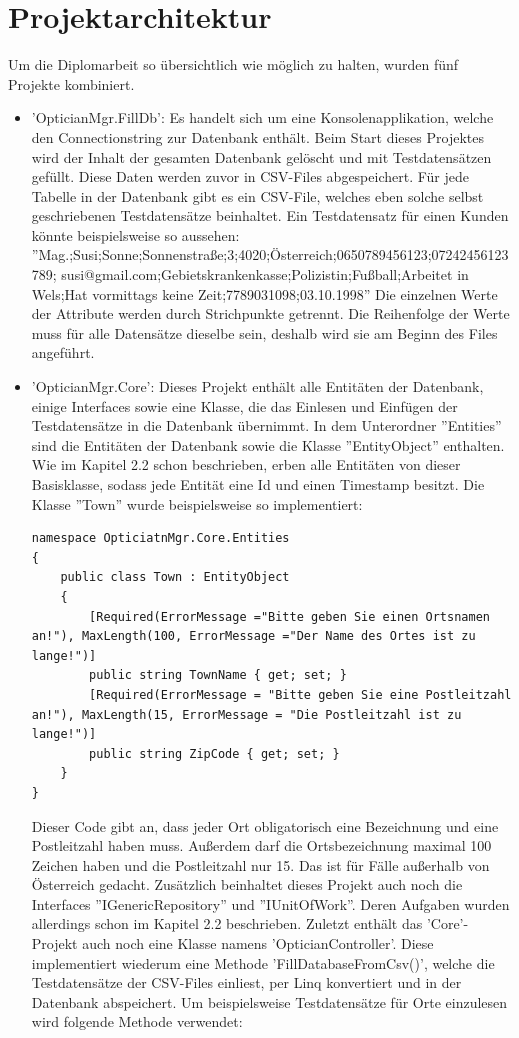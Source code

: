 \section{Projektarchitektur}
Um die Diplomarbeit so übersichtlich wie möglich zu halten, wurden fünf Projekte kombiniert.
\begin{itemize}
\item 'OpticianMgr.FillDb': Es handelt sich um eine Konsolenapplikation, welche den Connectionstring zur Datenbank enthält. Beim Start dieses Projektes wird der Inhalt der gesamten Datenbank gelöscht und mit Testdatensätzen gefüllt. Diese Daten werden zuvor in CSV-Files abgespeichert. Für jede Tabelle in der Datenbank gibt es ein CSV-File, welches eben solche selbst geschriebenen Testdatensätze beinhaltet. Ein Testdatensatz für einen Kunden könnte beispielsweise so aussehen: \newline ''Mag.;Susi;Sonne;Sonnenstraße;3;4020;Österreich;0650789456123;07242456123789; susi@gmail.com;Gebietskrankenkasse;Polizistin;Fußball;Arbeitet in Wels;Hat vormittags keine Zeit;7789031098;03.10.1998'' \newline Die einzelnen Werte der Attribute werden durch Strichpunkte getrennt. Die Reihenfolge der Werte muss für alle Datensätze dieselbe sein, deshalb wird sie am Beginn des Files angeführt.
\item 'OpticianMgr.Core': Dieses Projekt enthält alle Entitäten der Datenbank, einige Interfaces sowie eine Klasse, die das Einlesen und Einfügen der Testdatensätze in die Datenbank übernimmt. \newline In dem Unterordner ''Entities'' sind die Entitäten der Datenbank sowie die Klasse ''EntityObject'' enthalten. Wie im Kapitel 2.2 schon beschrieben, erben alle Entitäten von dieser Basisklasse, sodass jede Entität eine Id und einen Timestamp besitzt. Die Klasse ''Town'' wurde beispielsweise so implementiert:
\begin{lstlisting}
namespace OpticiatnMgr.Core.Entities
{
    public class Town : EntityObject
    {
        [Required(ErrorMessage ="Bitte geben Sie einen Ortsnamen an!"), MaxLength(100, ErrorMessage ="Der Name des Ortes ist zu lange!")]
        public string TownName { get; set; }
        [Required(ErrorMessage = "Bitte geben Sie eine Postleitzahl an!"), MaxLength(15, ErrorMessage = "Die Postleitzahl ist zu lange!")]
        public string ZipCode { get; set; }
    }
}
\end{lstlisting}
Dieser Code gibt an, dass jeder Ort obligatorisch eine Bezeichnung und eine Postleitzahl haben muss. Außerdem darf die Ortsbezeichnung maximal 100 Zeichen haben und die Postleitzahl nur 15. Das ist für Fälle außerhalb von Österreich gedacht. \newline Zusätzlich beinhaltet dieses Projekt auch noch die Interfaces ''IGenericRepository'' und ''IUnitOfWork''. Deren Aufgaben wurden allerdings schon im Kapitel 2.2 beschrieben. \newline Zuletzt enthält das 'Core'-Projekt auch noch eine Klasse namens 'OpticianController'. Diese implementiert wiederum eine Methode 'FillDatabaseFromCsv()', welche die Testdatensätze der CSV-Files einliest, per Linq konvertiert und in der Datenbank abspeichert. Um beispielsweise Testdatensätze für Orte einzulesen wird folgende Methode verwendet: 

\end{itemize}
